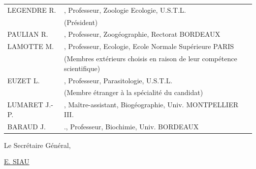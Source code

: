 \begin{tabular}{lp{.75\linewidth}}
LEGENDRE R. & , Professeur, Zoologie Ecologie, U.S.T.L.\\
& (Président)\\[1ex]
PAULIAN R. & , Professeur, Zoogéographie, Rectorat BORDEAUX\\
LAMOTTE M. & , Professeur, Ecologie, Ecole Normale Supérieure PARIS\\
& (Membres extérieurs choisis en raison de leur compétence scientifique)\\[1ex]
EUZET L. & , Professeur, Parasitologie, U.S.T.L.\\
& (Membre étranger à la spécialité du candidat)\\
LUMARET J.-P. & , Maître-assistant, Biogéographie, Univ. MONTPELLIER III.\\
BARAUD J. & ., Professeur, Biochimie, Univ. BORDEAUX
\end{tabular}
Le Secrétaire Général,


\uline{E. SIAU}
